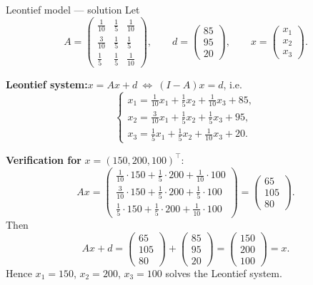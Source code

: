 \documentclass[9pt]{beamer}
\begin{document}
\begin{frame}{Leontief model — solution}
\small
Let 
\[
A=\begin{pmatrix}
\tfrac{1}{10} & \tfrac{1}{5} & \tfrac{1}{10}\\[2pt]
\tfrac{3}{10} & \tfrac{1}{5} & \tfrac{1}{5}\\[2pt]
\tfrac{1}{5}  & \tfrac{1}{5} & \tfrac{1}{10}
\end{pmatrix},\qquad
d=\begin{pmatrix}85\\95\\20\end{pmatrix},\qquad
x=\begin{pmatrix}x_1\\x_2\\x_3\end{pmatrix}.
\]

\textbf{Leontief system:}\quad $x=Ax+d\ \Longleftrightarrow\ (I-A)x=d$, i.e.
\[
\begin{cases}
x_1=\tfrac{1}{10}x_1+\tfrac{1}{5}x_2+\tfrac{1}{10}x_3+85,\\
x_2=\tfrac{3}{10}x_1+\tfrac{1}{5}x_2+\tfrac{1}{5}x_3+95,\\
x_3=\tfrac{1}{5}x_1+\tfrac{1}{5}x_2+\tfrac{1}{10}x_3+20.
\end{cases}
\]

\textbf{Verification for } $x=(150,200,100)^\top$:
\[
Ax=
\begin{pmatrix}
\frac{1}{10}\cdot150+\frac{1}{5}\cdot200+\frac{1}{10}\cdot100\\[2pt]
\frac{3}{10}\cdot150+\frac{1}{5}\cdot200+\frac{1}{5}\cdot100\\[2pt]
\frac{1}{5}\cdot150+\frac{1}{5}\cdot200+\frac{1}{10}\cdot100
\end{pmatrix}
=
\begin{pmatrix}
65\\105\\80
\end{pmatrix}.
\]
Then
\[
Ax+d=
\begin{pmatrix}65\\105\\80\end{pmatrix}
+
\begin{pmatrix}85\\95\\20\end{pmatrix}
=
\begin{pmatrix}150\\200\\100\end{pmatrix}=x.
\]
Hence $x_1=150$, $x_2=200$, $x_3=100$ solves the Leontief system.
\end{frame}
\end{document}

